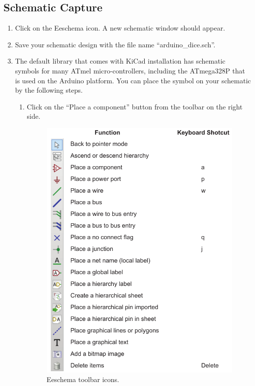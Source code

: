 \documentclass[12pt,letterpaper]{scrartcl}
\begin{document}
\newpage
\subsection{Schematic Capture}

\begin{enumerate}
	\item Click on the Eeschema icon. A new schematic window should appear.
	\item Save your schematic design with the file name ``arduino\_dice.sch''. 
	\item The default library that comes with KiCad installation has schematic symbols for many ATmel micro-controllers, including the ATmega328P that is used on the Arduino platform. You can place the symbol on your schematic by the following steps. 
		\begin{enumerate}
			\item Click on the ``Place a component'' button from the toolbar on the right side.
			
				\begin{figure}[h]
					\centering
					\includegraphics{eeschema-toolbar}
					\caption{Eeschema toolbar icons.}
					\label{fig:eeschema-toolbar}
				\end{figure}
				

\end{enumerate}
\end{enumerate}
\end{document}
